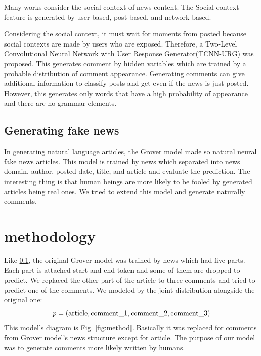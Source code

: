 \documentclass[conference]{IEEEtran}
\begin{document}
Many works consider the social context of news content.
The Social context feature is generated by user-based\cite{Castillo:2011:ICT:1963405.1963500,8397048,DBLP:journals/corr/abs-1904-13355}, 
post-based\cite{Yang2019UnsupervisedFN,Tacchini2017SomeLI,Jin:2016:NVE:3016100.3016318},
 and network-based\cite{Wu:2018:TFF:3159652.3159677,DBLP:journals/corr/abs-1902-06673}.

Considering the social context, it must wait for moments from posted because social contexts are made by users who are exposed.
Therefore, a Two-Level Convolutional Neural Network with User Response Generator(TCNN-URG) was proposed\cite{ijcai2018-533}.
This generates comment by hidden variables which are trained by a probable distribution of comment appearance.
Generating comments can give additional information to classify posts and get even if the news is just posted.
However, this generates only words that have a high probability of appearance and there are no grammar elements.

\subsection{Generating fake news}
\label{subsec:generate}
In generating natural language articles, the Grover model made so natural neural fake news articles\cite{NIPS2019_9106}.
This model is trained by news which separated into news domain, author, posted date, title, and article and evaluate the prediction.
The interesting thing is that human beings are more likely to be fooled by generated articles being real ones.
We tried to extend this model and generate naturally comments.
\section{methodology}
Like \ref{subsec:generate}, the original Grover model was trained by news which had five parts.
Each part is attached start and end token and some of them are dropped to predict.
We replaced the other part of the article to three comments and tried to predict one of the comments.
We modeled by the joint distribution alongside the original one:
\begin{equation}
    \label{eq:joint_distri}
    p = (\rm{article}, \rm{comment\_1}, \rm{comment\_2}, \rm{comment\_3})
\end{equation}
This model's diagram is Fig. \ref{fig:method}.
Basically it was replaced for comments from Grover model's news structure except for article.
The purpose of our model was to generate comments more likely written by humans.
\end{document}
